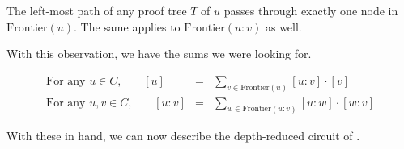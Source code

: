 \begin{observation}
The left-most path of any proof tree $T$ of $u$ passes through exactly one node in $\mathrm{Frontier}(u)$. The same applies to $\mathrm{Frontier}(u:v)$ as well. 
\end{observation}

With this observation, we have the sums we were looking for. 

\begin{eqnarray}\label{eqn:VSBR-split-frontier}
\text{For any $u\in C$,}\quad\quad [u] &=& \sum_{v\in \mathrm{Frontier}(u)} [u:v]\cdot [v] \label{eqn:VSBR-split-frontier-u}\\
\text{For any $u,v\in C$,}\quad\quad [u:v] &=& \sum_{w\in \mathrm{Frontier}(u:v)} [u:w]\cdot [w:v] \label{eqn:VSBR-split-frontier-u:v}
\end{eqnarray}

With these in hand, we can now describe the depth-reduced circuit of \cite{vsbr83}. \\


